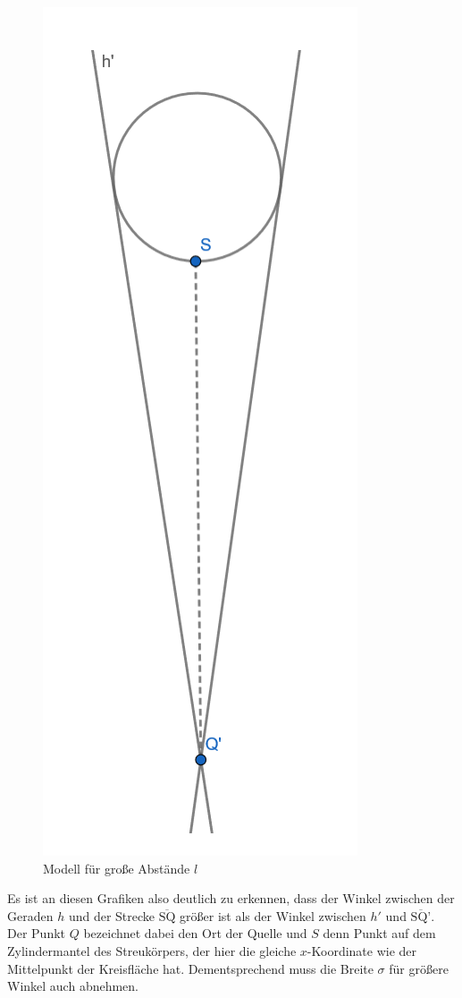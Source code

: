 \documentclass[german,  %
parskip=full,  %
]{scrartcl}
\begin{document}
\begin{figure}[h!]\centering
\includegraphics[scale=0.4]{abstand2}
\caption{Modell für große Abstände $l$}
\end{figure}
\newpage
Es ist an diesen Grafiken also deutlich zu erkennen, dass der Winkel zwischen der Geraden $h$ und der Strecke $\overline{\text{SQ}}$ größer ist als der Winkel zwischen $h'$ und $\overline{\text{SQ'}}$. Der Punkt $Q$ bezeichnet dabei den Ort der Quelle und $S$ denn Punkt auf dem Zylindermantel des Streukörpers, der hier die gleiche $x$-Koordinate wie der Mittelpunkt der Kreisfläche hat. Dementsprechend muss die Breite $\sigma$ für größere Winkel auch abnehmen.
\end{document}
